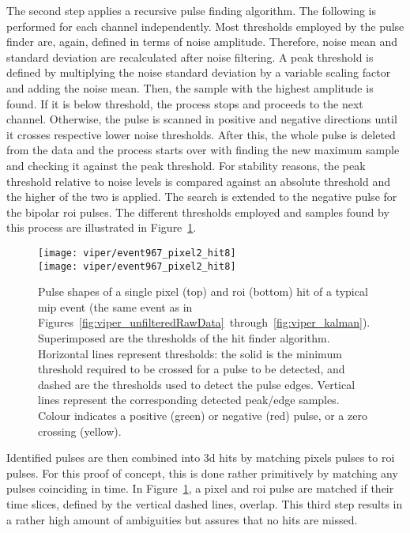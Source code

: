 The second step applies a recursive pulse finding algorithm.
The following is performed for each channel independently.
Most thresholds employed by the pulse finder are, again, defined in terms of noise amplitude.
Therefore, noise mean and standard deviation are recalculated after noise filtering.
A peak threshold is defined by multiplying the noise standard deviation by a variable scaling factor and adding the noise mean.
Then, the sample with the highest amplitude is found.
If it is below threshold, the process stops and proceeds to the next channel.
Otherwise, the pulse is scanned in positive and negative directions until it crosses respective lower noise thresholds.
After this, the whole pulse is deleted from the data and the process starts over with finding the new maximum sample and checking it against the peak threshold.
For stability reasons, the peak threshold relative to noise levels is compared against an absolute threshold and the higher of the two is applied.
The search is extended to the negative pulse for the bipolar \gls{roi} pulses.
The different thresholds employed and samples found by this process are illustrated in Figure~\ref{fig:viper_hitFinder}.

\begin{figure}[htb]
	\centering
	\texttt{[image: viper/event967\_pixel2\_hit8]}\\
	\texttt{[image: viper/event967\_pixel2\_hit8]}
	\caption[Pulse shapes of typical pixel demonstrator event]{%
		Pulse shapes of a single pixel (top) and \acrshort{roi} (bottom) hit of a typical \acrshort{mip} event (the same event as in Figures~\ref{fig:viper_unfilteredRawData}~through~\ref{fig:viper_kalman}).
		Superimposed are the thresholds of the hit finder algorithm. Horizontal lines represent thresholds: the solid is the minimum threshold required to be crossed for a pulse to be detected, and dashed are the thresholds used to detect the pulse edges.
		Vertical lines represent the corresponding detected peak/edge samples.
		Colour indicates a positive (green) or negative (red) pulse, or a zero crossing (yellow).
	}
	\label{fig:viper_hitFinder}
\end{figure}

Identified pulses are then combined into \gls{3d} hits by matching pixels pulses to \gls{roi} pulses.
For this proof of concept, this is done rather primitively by matching any pulses coinciding in time.
In Figure~\ref{fig:viper_hitFinder}, a pixel and \gls{roi} pulse are matched if their time slices, defined by the vertical dashed lines, overlap.
This third step results in a rather high amount of ambiguities but assures that no hits are missed.

